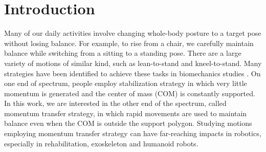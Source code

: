 \section{Introduction}


Many of our daily activities involve changing whole-body posture to a target pose without losing balance. For example, to rise from a chair, we carefully maintain balance while switching from a sitting to a standing pose. There are a large variety of motions of similar kind, such as lean-to-stand and kneel-to-stand. Many strategies have been identified to achieve these tasks in biomechanics studies \cite{}. On one end of spectrum, people employ stabilization strategy in which very  little momentum is generated and the center of mass (COM) is constantly supported. In this work, we are interested in the other end of the spectrum, called momentum transfer strategy, in which rapid movements are used to maintain balance even when the COM is outside the support polygon. Studying motions employing momentum transfer strategy can have far-reaching impacts in robotics, especially in rehabilitation, exoskeleton and humanoid robots. 





